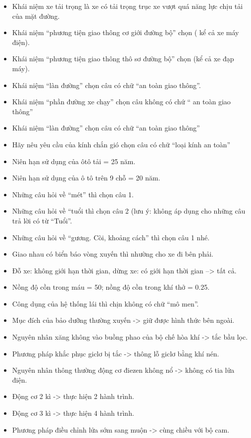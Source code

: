 \documentclass{article}
\begin{document}
\begin{itemize}
\item     Khái niệm xe tải trọng là xe có tải trọng trục xe vượt quá năng lực chịu tải của mặt đường.
\item     Khái niệm “phương tiện giao thông cơ giới đường bộ” chọn ( kể cả xe máy điện).
\item     Khái niệm “phương tiện giao thông thô sơ đường bộ” chọn (kể cả xe đạp máy).
\item     Khái niệm “làn đường” chọn câu có chữ “an toàn giao thông”.
\item     Khái niệm “phần đường xe chạy” chọn câu không có chứ “ an toàn giao thông”
\item     Khái niệm “làn đường” chọn câu có chữ “an toàn giao thông”
\item     Hãy nêu yêu cầu của kính chắn gió chọn câu có chữ “loại kính an toàn”
\item     Niên hạn sử dụng của ôtô tải = 25 năm.
\item     Niên hạn sử dụng của ô tô trên 9 chỗ = 20 năm.
\item     Những câu hỏi về “mét” thì chọn câu 1.
\item     Những câu hỏi về “tuổi thì chọn câu 2 (lưu ý: không áp dụng cho những câu trả lời có từ “Tuổi”.
\item     Những câu hỏi về “gương. Còi, khoảng cách” thì chọn câu 1 nhé.
\item     Giao nhau có biển báo vòng xuyến thì nhường cho xe đi bên phải.
\item     Đỗ xe: không giới hạn thời gian, dừng xe: có giới hạn thời gian –> tất cả.
\item     Nồng độ cồn trong máu = 50; nồng độ cồn trong khí thở = 0.25.
\item     Công dụng của hệ thống lái thì chịn không có chữ “mô men”.
\item     Mục đích của bảo dưỡng thường xuyến -> giữ được hình thức bên ngoài.
\item     Nguyên nhân xăng không vào buồng phao của bộ chế hòa khí -> tắc bầu lọc.
\item     Phương pháp khắc phục giclơ bị tắc -> thông lỗ giclơ bằng khí nén.
\item     Nguyên nhân thông thường động cơ điezen không nổ -> không có tia lửa điện.
\item     Động cơ 2 kì -> thực hiện 2 hành trình.
\item     Động cơ 3 kì -> thực hiện 4 hành trình.
\item     Phương pháp điều chỉnh lửa sớm sang muộn -> cùng chiều với bộ cam.

\end{itemize}
\end{document}
